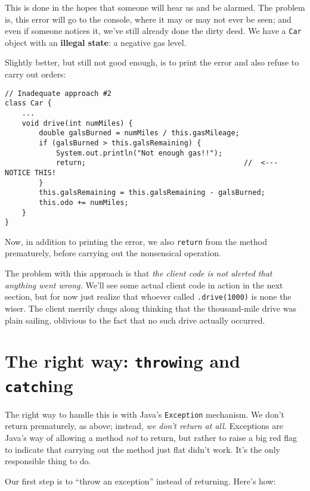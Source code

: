 This is done in the hopes that someone will hear us and be alarmed. The
problem is, this error will go to the console, where it may or may not ever be
seen; and even if someone notices it, we've still already done the dirty deed.
We have a \texttt{Car} object with an \textbf{illegal state}: a negative gas
level.

Slightly better, but still not good enough, is to print the error and also
refuse to carry out orders:

\begin{Verbatim}[samepage=true,fontsize=\footnotesize,frame=single]
// Inadequate approach #2
class Car {
    ...
    void drive(int numMiles) {
        double galsBurned = numMiles / this.gasMileage;
        if (galsBurned > this.galsRemaining) {
            System.out.println("Not enough gas!!");
            return;                                     //  <---  NOTICE THIS!
        }
        this.galsRemaining = this.galsRemaining - galsBurned;
        this.odo += numMiles;
    }
}
\end{Verbatim}

Now, in addition to printing the error, we also \texttt{return} from the
method prematurely, before carrying out the nonsensical operation.

The problem with this approach is that \textit{the client code is not alerted
that anything went wrong.} We'll see some actual client code in action in the
next section, but for now just realize that whoever called
\texttt{.drive(1000)} is none the wiser. The client merrily chugs along
thinking that the thousand-mile drive was plain sailing, oblivious to the fact
that no such drive actually occurred.

\section{The right way: \texttt{throw}ing and \texttt{catch}ing}

The right way to handle this is with Java's \texttt{Exception} mechanism. We
don't return prematurely, as above; instead, \textit{we don't return at all.}
Exceptions are Java's way of allowing a method \textit{not} to return, but
rather to raise a big red flag to indicate that carrying out the method just
flat didn't work. It's the only responsible thing to do.

Our first step is to ``throw an exception'' instead of returning. Here's how:

